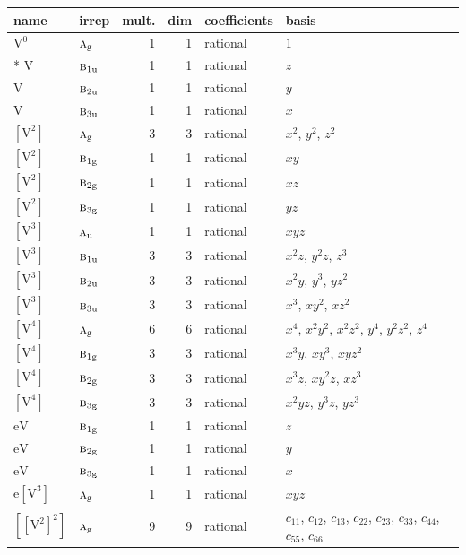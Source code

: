 \documentclass[10pt,a4paper]{article}
\numberwithin{equation}{section}
\newcommand{\irr}[1]{\text{\normalfont\scshape #1}}
\newcommand{\ptag}[1]{\mathrm{#1}}
\newcommand{\jahn}[1]{\mathrm{#1}}
\newlength{\fillwidth}\newlength{\cellwidth}\newlength{\colwidth}
\begin{document}
{\begin{longtable}{@{}llrrl>{\RaggedRight\arraybackslash}p{\fillwidth}@{}}
name & irrep & mult. & dim & coefficients & basis\\\midrule\endhead
\bottomrule\endfoot\endlastfoot
$\jahn{V^{0}}$ & $\irr{a}_{\ptag{g}}$ & 1 & 1 & rational & $1$\\*
$\jahn{V}$ & $\irr{b}_{1\ptag{u}}$ & 1 & 1 & rational & $z$\\
$\jahn{V}$ & $\irr{b}_{2\ptag{u}}$ & 1 & 1 & rational & $y$\\
$\jahn{V}$ & $\irr{b}_{3\ptag{u}}$ & 1 & 1 & rational & $x$\\
$\jahn{[V^{2}]}$ & $\irr{a}_{\ptag{g}}$ & 3 & 3 & rational & $x^{2}$, $y^{2}$, $z^{2}$\\
$\jahn{[V^{2}]}$ & $\irr{b}_{1\ptag{g}}$ & 1 & 1 & rational & $xy$\\
$\jahn{[V^{2}]}$ & $\irr{b}_{2\ptag{g}}$ & 1 & 1 & rational & $xz$\\
$\jahn{[V^{2}]}$ & $\irr{b}_{3\ptag{g}}$ & 1 & 1 & rational & $yz$\\
$\jahn{[V^{3}]}$ & $\irr{a}_{\ptag{u}}$ & 1 & 1 & rational & $xyz$\\
$\jahn{[V^{3}]}$ & $\irr{b}_{1\ptag{u}}$ & 3 & 3 & rational & $x^{2}z$, $y^{2}z$, $z^{3}$\\
$\jahn{[V^{3}]}$ & $\irr{b}_{2\ptag{u}}$ & 3 & 3 & rational & $x^{2}y$, $y^{3}$, $yz^{2}$\\
$\jahn{[V^{3}]}$ & $\irr{b}_{3\ptag{u}}$ & 3 & 3 & rational & $x^{3}$, $xy^{2}$, $xz^{2}$\\
$\jahn{[V^{4}]}$ & $\irr{a}_{\ptag{g}}$ & 6 & 6 & rational & $x^{4}$, $x^{2}y^{2}$, $x^{2}z^{2}$, $y^{4}$, $y^{2}z^{2}$, $z^{4}$\\
$\jahn{[V^{4}]}$ & $\irr{b}_{1\ptag{g}}$ & 3 & 3 & rational & $x^{3}y$, $xy^{3}$, $xyz^{2}$\\
$\jahn{[V^{4}]}$ & $\irr{b}_{2\ptag{g}}$ & 3 & 3 & rational & $x^{3}z$, $xy^{2}z$, $xz^{3}$\\
$\jahn{[V^{4}]}$ & $\irr{b}_{3\ptag{g}}$ & 3 & 3 & rational & $x^{2}yz$, $y^{3}z$, $yz^{3}$\\
$\jahn{eV}$ & $\irr{b}_{1\ptag{g}}$ & 1 & 1 & rational & $z$\\
$\jahn{eV}$ & $\irr{b}_{2\ptag{g}}$ & 1 & 1 & rational & $y$\\
$\jahn{eV}$ & $\irr{b}_{3\ptag{g}}$ & 1 & 1 & rational & $x$\\
$\jahn{e[V^{3}]}$ & $\irr{a}_{\ptag{g}}$ & 1 & 1 & rational & $xyz$\\
$\jahn{[[V^{2}]^{2}]}$ & $\irr{a}_{\ptag{g}}$ & 9 & 9 & rational & $c_{11}$, $c_{12}$, $c_{13}$, $c_{22}$, $c_{23}$, $c_{33}$, $c_{44}$, $c_{55}$, $c_{66}$\\

\end{longtable}}
\end{document}
